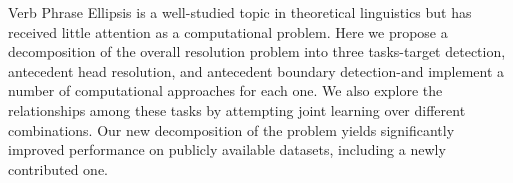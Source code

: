 Verb Phrase Ellipsis is a well-studied topic in theoretical linguistics but has received little attention as a computational problem. Here we propose a decomposition of the overall resolution problem into three tasks-target detection, antecedent head resolution, and antecedent boundary detection-and implement a number of computational approaches for each one. We also explore the relationships among these tasks by attempting joint learning over different combinations. Our new decomposition of the problem yields significantly improved performance on publicly available datasets, including a newly contributed one.
